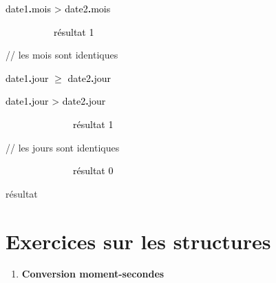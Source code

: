 {\sffamily
\textstyleMotCl{\textcolor{black}{\ \ \ \ \ \ \ \ si}}\textcolor{black}{
date1}\textbf{\textcolor{black}{.}}\textcolor{black}{mois
{\textgreater}
date2}\textbf{\textcolor{black}{.}}\textcolor{black}{mois
}\textstyleMotCl{\textcolor{black}{alors}}}

{\sffamily
\textcolor{black}{\ \ \ \ \ \ \ \ \ \ résultat
}\textstyleMotCl{{\textcolor{black}{←}}}\textcolor{black}{
1}}

{\sffamily
{} // les mois sont identiques}

{\sffamily
\textstyleMotCl{\textcolor{black}{\ \ \ \ \ \ \ \ \ \ si}}\textcolor{black}{
date1}\textbf{\textcolor{black}{.}}\textcolor{black}{jour
}\textrm{\textcolor{black}{${\geq}$}}\textcolor{black}{
date2}\textbf{\textcolor{black}{.}}\textcolor{black}{jour
}\textstyleMotCl{\textcolor{black}{alors}}}

{\sffamily
\textstyleMotCl{\textcolor{black}{\ \ \ \ \ \ \ \ \ \ \ \ si}}\textcolor{black}{
date1}\textbf{\textcolor{black}{.}}\textcolor{black}{jour
{\textgreater}
date2}\textbf{\textcolor{black}{.}}\textcolor{black}{jour
}\textstyleMotCl{\textcolor{black}{alors}}}

{\sffamily
\textcolor{black}{\ \ \ \ \ \ \ \ \ \ \ \ \ \ résultat
}\textstyleMotCl{{\textcolor{black}{←}}}\textcolor{black}{
1}}

{\sffamily
{} // les jours sont
identiques}

{\sffamily
\textcolor{black}{\ \ \ \ \ \ \ \ \ \ \ \ \ \ résultat
}\textstyleMotCl{{\textcolor{black}{←}}}\textcolor{black}{
0}}

{\sffamily
{} }

{\sffamily
{} }

{\sffamily
{} }

{\sffamily
{} }

{\sffamily
{} }

{\sffamily
{} }

{\sffamily
{} résultat}

{\sffamily
{} }

\section{Exercices sur les structures}
\liststyleExercice
\begin{enumerate}
\item {\sffamily\bfseries
Conversion moment-secondes}
\end{enumerate}
{
}

